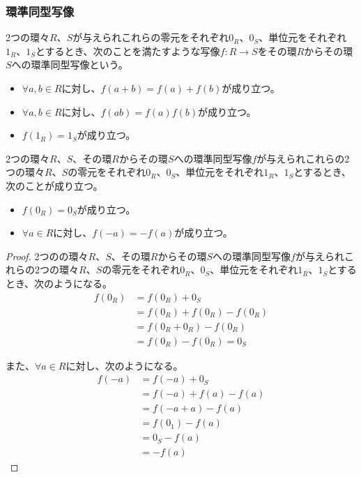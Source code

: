 \documentclass[dvipdfmx]{jsarticle}
\begin{document}
\subsubsection{環準同型写像}%
\begin{dfn}
2つの環々$R$、$S$が与えられこれらの零元をそれぞれ$0_{R}$、$0_{S}$、単位元をそれぞれ$1_{R}$、$1_{S}$とするとき、次のことを満たすような写像$f:R \rightarrow S$をその環$R$からその環$S$への環準同型写像という。
\begin{itemize}
\item
  $\forall a,b \in R$に対し、$f(a + b) = f(a) + f(b)$が成り立つ。
\item
  $\forall a,b \in R$に対し、$f(ab) = f(a)f(b)$が成り立つ。
\item
  $f\left( 1_{R} \right) = 1_{S}$が成り立つ。
\end{itemize}
\end{dfn}
\begin{thm}\label{3.3.2.13}
2つの環々$R$、$S$、その環$R$からその環$S$への環準同型写像$f$が与えられこれらの2つの環々$R$、$S$の零元をそれぞれ$0_{R}$、$0_{S}$、単位元をそれぞれ$1_{R}$、$1_{S}$とするとき、次のことが成り立つ。
\begin{itemize}
\item
  $f\left( 0_{R} \right) = 0_{S}$が成り立つ。
\item
  $\forall a \in R$に対し、$f( - a) = - f(a)$が成り立つ。
\end{itemize}
\end{thm}
\begin{proof}
2つのの環々$R$、$S$、その環$R$からその環$S$への環準同型写像$f$が与えられこれらの2つの環々$R$、$S$の零元をそれぞれ$0_{R}$、$0_{S}$、単位元をそれぞれ$1_{R}$、$1_{S}$とするとき、次のようになる。
\begin{align*}
f\left( 0_{R} \right) &= f\left( 0_{R} \right) + 0_{S}\\
&= f\left( 0_{R} \right) + f\left( 0_{R} \right) - f\left( 0_{R} \right)\\
&= f\left( 0_{R} + 0_{R} \right) - f\left( 0_{R} \right)\\
&= f\left( 0_{R} \right) - f\left( 0_{R} \right) = 0_{S}
\end{align*}\par
また、$\forall a \in R$に対し、次のようになる。
\begin{align*}
f( - a) &= f( - a) + 0_{S}\\
&= f( - a) + f(a) - f(a)\\
&= f( - a + a) - f(a)\\
&= f\left( 0_{1} \right) - f(a)\\
&= 0_{S} - f(a)\\
&= - f(a)
\end{align*}
\end{proof}
\end{document}
